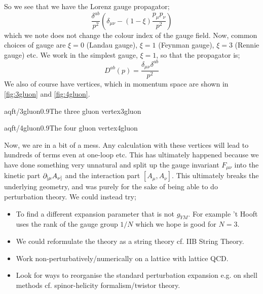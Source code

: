 So we see that we have the Lorenz gauge propagator;
\begin{equation}
\frac{\delta^{ab}}{p^2}\left(\delta_{\mu\nu} - (1 - \xi)\frac{p_\mu p_\nu}{p^2}\right)
\end{equation}
which we note does not change the colour index of the gauge field. Now, common choices of gauge are $\xi = 0$ (Landau gauge), $\xi = 1$ (Feynman gauge), $\xi = 3$ (Rennie gauge) etc. We work in the simplest gauge, $\xi = 1$, so that the propagator is;
\begin{equation}
D^{ab}(p) = \frac{\delta_{\mu\nu}\delta^{ab}}{p^2}
\end{equation}
We also of course have vertices, which in momentum space are shown in \autoref{fig:3gluon} and \autoref{fig:4gluon}.
\begin{mygraphic}{aqft/3gluon}{0.9}{The three gluon vertex}{3gluon}\end{mygraphic}
\begin{mygraphic}{aqft/4gluon}{0.9}{The four gluon vertex}{4gluon}\end{mygraphic}
Now, we are in a bit of a mess. Any calculation with these vertices will lead to hundreds of terms even at one-loop etc. This has ultimately happened because we have done something very unnatural and split up the gauge invariant $F_{\mu\nu}$ into the kinetic part $\partial_{[\mu}A_{\nu]}$ and the interaction part $[A_\mu, A_\nu]$. This ultimately breaks the underlying geometry, and was purely for the sake of being able to do perturbation theory. We could instead try;
\begin{itemize}
\item To find a different expansion parameter that is not $g_{YM}$. For example 't Hooft uses the rank of the gauge group $1/N$ which we hope is good for $N = 3$.
\item We could reformulate the theory as a string theory cf. IIB String Theory.
\item Work non-perturbatively/numerically on a lattice with lattice QCD.
\item Look for ways to reorganise the standard perturbation expansion e.g. on shell methods cf. spinor-helicity formalism/twistor theory.
\end{itemize}

